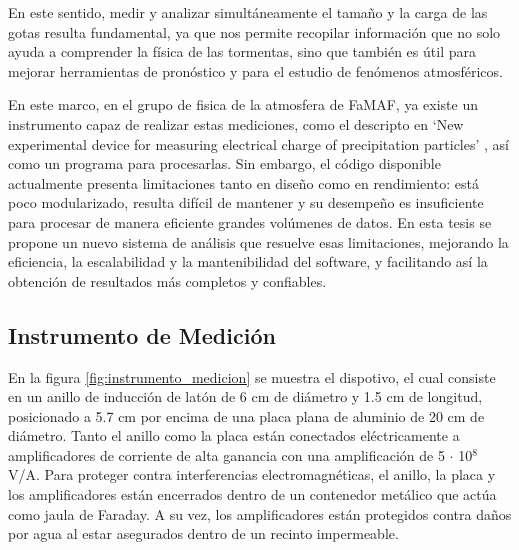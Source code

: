 \documentclass[12pt,a4paper]{article}
\begin{document}
En este sentido, medir y analizar simultáneamente el tamaño y la carga de las gotas resulta fundamental, ya que nos permite recopilar información que no solo ayuda a comprender la física de las tormentas, sino que también es útil para mejorar herramientas de pronóstico y para el estudio de fenómenos atmosféricos.

En este marco, en el grupo de fisica de la atmosfera de FaMAF, ya existe un instrumento capaz de realizar estas mediciones, como el descripto en `New experimental device for measuring electrical charge of precipitation particles' \cite{pereyra2025}, así como un programa para procesarlas. Sin embargo, el código disponible actualmente presenta limitaciones tanto en diseño como en rendimiento: está poco modularizado, resulta difícil de mantener y su desempeño es insuficiente para procesar de manera eficiente grandes volúmenes de datos. En esta tesis se propone un nuevo sistema de análisis que resuelve esas limitaciones, mejorando la eficiencia, la escalabilidad y la mantenibilidad del software, y facilitando así la obtención de resultados más completos y confiables.

\subsection{Instrumento de Medición}
\lhead{}

En la figura \ref{fig:instrumento_medicion} se muestra el dispotivo, el cual consiste en un anillo de inducción de latón de 6 cm de diámetro y 1.5 cm de longitud, posicionado a 5.7 cm por encima de una placa plana de aluminio de 20 cm de diámetro. Tanto el anillo como la placa están conectados eléctricamente a amplificadores de corriente de alta ganancia con una amplificación de 5 $\cdot$ 10$^8$ V/A. Para proteger contra interferencias electromagnéticas, el anillo, la placa y los amplificadores están encerrados dentro de un contenedor metálico que actúa como jaula de Faraday. A su vez, los amplificadores están protegidos contra daños por agua al estar asegurados dentro de un recinto impermeable.
\end{document}
